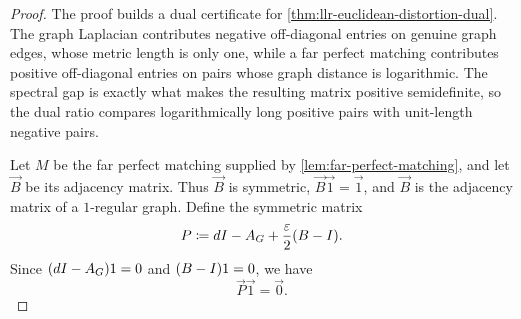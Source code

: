 \begin{proof}
	The proof builds a dual certificate for \cref{thm:llr-euclidean-distortion-dual}. The graph Laplacian contributes negative off-diagonal entries on genuine graph edges, whose metric length is only one, while a far perfect matching contributes positive off-diagonal entries on pairs whose graph distance is logarithmic. The spectral gap is exactly what makes the resulting matrix positive semidefinite, so the dual ratio compares logarithmically long positive pairs with unit-length negative pairs.

	Let \(M\) be the far perfect matching supplied by \cref{lem:far-perfect-matching}, and let \(\vec{B}\) be its adjacency matrix. Thus \(\vec{B}\) is symmetric, \(\vec{B}\vec{1}=\vec{1}\), and \(\vec{B}\) is the adjacency matrix of a \(1\)-regular graph. Define the symmetric matrix
	\begin{equation}
		\label{eq:expander-distortion-certificate}
		P\coloneqq dI-A_{G}+\frac{\varepsilon}{2}(B-I).
	\end{equation}
	Since \((dI-A_{G})1=0\) and \((B-I)1=0\), we have
	\begin{equation}
		\label{eq:distortion-certificate-row-sums}
		\vec{P}\vec{1}=\vec{0}.
	\end{equation}


\end{proof}
